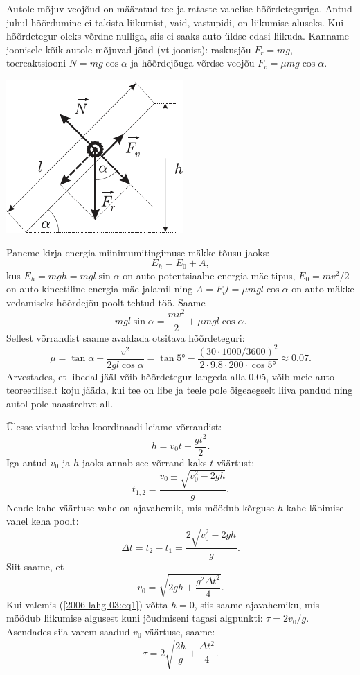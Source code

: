 \documentclass[10pt, twoside]{article}
\begin{document}
{%

\solu
Autole mõjuv veojõud on määratud tee ja rataste vahelise hõõrdeteguriga. Antud juhul hõõrdumine ei takista liikumist, vaid, vastupidi, on liikumise aluseks. Kui hõõrdetegur oleks võrdne nulliga, siis ei saaks auto üldse edasi liikuda. Kanname joonisele kõik autole mõjuvad jõud (vt joonist): raskusjõu $F_r = mg$, toereaktsiooni $N = mg \cos \alpha$ ja hõõrdejõuga võrdse veojõu $F_v = \mu mg \cos \alpha$.

\begin{center}
	\includegraphics[width=0.5\linewidth]{2005-lahg-02-lah}
\end{center}

Paneme kirja energia miinimumitingimuse mäkke tõusu jaoks:
\[
E_h = E_0 + A,
\]
kus $E_h = mgh = mgl\sin \alpha$ on auto potentsiaalne energia mäe tipus, $E_0 = mv^2/2$ on auto kineetiline energia mäe jalamil ning $A = F_vl = \mu mgl \cos \alpha$ on auto mäkke vedamiseks hõõrdejõu poolt tehtud töö. Saame
\[
m g l \sin \alpha=\frac{m v^{2}}{2}+\mu m g l \cos \alpha.
\]
Sellest võrrandist saame avaldada otsitava hõõrdeteguri:
\[
\mu=\tan \alpha-\frac{v^{2}}{2 g l \cos \alpha}=\tan \ang{5}-\frac{(\num{30} \cdot \num{1000} / \num{3600})^{2}}{\num{2} \cdot \num{9,8} \cdot \num{200} \cdot \cos \ang{5}} \approx \num{0,07}.
\]
Arvestades, et libedal jääl võib hõõrdetegur langeda alla \num{0,05}, võib meie auto teoreetiliselt koju jääda, kui tee on libe ja teele pole õigeaegselt liiva pandud ning autol pole naastrehve all.
\probend
\bigskip


\solu
Ülesse visatud keha koordinaadi leiame võrrandist: 
\[
h = v_0t - \frac{gt^2}{2}.
\]
Iga antud $v_0$ ja $h$ jaoks annab see võrrand kaks $t$ väärtust:
\[
t_{1,2}=\frac{v_{0} \pm \sqrt{v_{0}^{2}-2 g h}}{g}.
\]
Nende kahe väärtuse vahe on ajavahemik, mis möödub kõrguse $h$ kahe läbimise vahel keha poolt:
\begin{equation} \label{2006-lahg-03:eq1}
\Delta t=t_{2}-t_{1}=\frac{2 \sqrt{v_{0}^{2}-2 g h}}{g}.
\end{equation}
Siit saame, et
\[
v_{0}=\sqrt{2 g h+\frac{g^{2} \Delta t^{2}}{4}}.
\]
Kui valemis (\ref{2006-lahg-03:eq1}) võtta $h = 0$, siis saame ajavahemiku, mis möödub liikumise algusest kuni jõudmiseni tagasi algpunkti: $\tau = 2v_0/g$. Asendades siia varem saadud $v_0$ väärtuse, saame:
\[
\tau=2 \sqrt{\frac{2 h}{g}+\frac{\Delta t^{2}}{4}}.
\]
\probend
\bigskip

}
\end{document}
